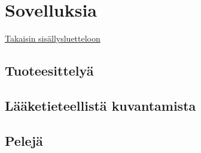 \section{Sovelluksia}
\label{sec:sovelluksia}
\hyperlink{index}{Takaisin sisällysluetteloon}
\subsection{Tuoteesittelyä}
\subsection{Lääketieteellistä kuvantamista}
\subsection{Pelejä}